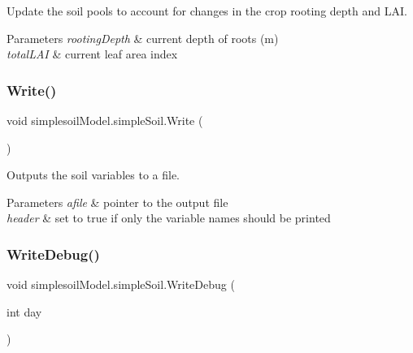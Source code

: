 Update the soil pools to account for changes in the crop rooting depth and L\+AI. 


\begin{DoxyParams}{Parameters}
{\em rooting\+Depth} & current depth of roots (m) \\
\hline
{\em total\+L\+AI} & current leaf area index \\
\hline
\end{DoxyParams}
\mbox{\label{classsimplesoil_model_1_1simple_soil_a8e716d4ae99f278b1bf013e04e0de57c}} 
\subsubsection{\texorpdfstring{Write()}{Write()}}
{\footnotesize\ttfamily void simplesoil\+Model.\+simple\+Soil.\+Write (\begin{DoxyParamCaption}{ }\end{DoxyParamCaption})\hspace{0.3cm}{\ttfamily [inline]}}



Outputs the soil variables to a file. 


\begin{DoxyParams}{Parameters}
{\em afile} & pointer to the output file \\
\hline
{\em header} & set to true if only the variable names should be printed \\
\hline
\end{DoxyParams}
\mbox{\label{classsimplesoil_model_1_1simple_soil_a082248ca3544715749dfa69649b1adee}} 
\subsubsection{\texorpdfstring{WriteDebug()}{WriteDebug()}}
{\footnotesize\ttfamily void simplesoil\+Model.\+simple\+Soil.\+Write\+Debug (\begin{DoxyParamCaption}\item[{int}]{day }\end{DoxyParamCaption})\hspace{0.3cm}{\ttfamily [inline]}}



